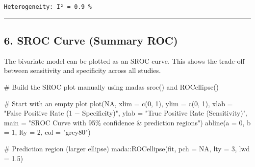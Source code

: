 \documentclass[
  letterpaper,
  DIV=11,
  numbers=noendperiod]{scrartcl}
\newenvironment{Shaded}{\begin{snugshade}}{\end{snugshade}}
\newcommand{\AttributeTok}[1]{\textcolor[rgb]{0.40,0.45,0.13}{#1}}
\newcommand{\CommentTok}[1]{\textcolor[rgb]{0.37,0.37,0.37}{#1}}
\newcommand{\ConstantTok}[1]{\textcolor[rgb]{0.56,0.35,0.01}{#1}}
\newcommand{\DecValTok}[1]{\textcolor[rgb]{0.68,0.00,0.00}{#1}}
\newcommand{\FloatTok}[1]{\textcolor[rgb]{0.68,0.00,0.00}{#1}}
\newcommand{\FunctionTok}[1]{\textcolor[rgb]{0.28,0.35,0.67}{#1}}
\newcommand{\NormalTok}[1]{\textcolor[rgb]{0.00,0.23,0.31}{#1}}
\newcommand{\SpecialCharTok}[1]{\textcolor[rgb]{0.37,0.37,0.37}{#1}}
\newcommand{\StringTok}[1]{\textcolor[rgb]{0.13,0.47,0.30}{#1}}
\begin{document}
\begin{verbatim}
Heterogeneity: I² = 0.9 %
\end{verbatim}

\begin{center}\rule{0.5\linewidth}{0.5pt}\end{center}

\subsection{6. SROC Curve (Summary ROC)}\label{sroc-curve-summary-roc}

The bivariate model can be plotted as an SROC curve. This shows the
trade-off between sensitivity and specificity across all studies.

\begin{Shaded}
\begin{Highlighting}[]
\CommentTok{\# Build the SROC plot manually using mada\textquotesingle{}s sroc() and ROCellipse()}

\CommentTok{\# Start with an empty plot}
\FunctionTok{plot}\NormalTok{(}\ConstantTok{NA}\NormalTok{, }\AttributeTok{xlim =} \FunctionTok{c}\NormalTok{(}\DecValTok{0}\NormalTok{, }\DecValTok{1}\NormalTok{), }\AttributeTok{ylim =} \FunctionTok{c}\NormalTok{(}\DecValTok{0}\NormalTok{, }\DecValTok{1}\NormalTok{),}
     \AttributeTok{xlab =} \StringTok{"False Positive Rate (1 − Specificity)"}\NormalTok{,}
     \AttributeTok{ylab =} \StringTok{"True Positive Rate (Sensitivity)"}\NormalTok{,}
     \AttributeTok{main =} \StringTok{"SROC Curve with 95\% confidence \& prediction regions"}\NormalTok{)}
\FunctionTok{abline}\NormalTok{(}\AttributeTok{a =} \DecValTok{0}\NormalTok{, }\AttributeTok{b =} \DecValTok{1}\NormalTok{, }\AttributeTok{lty =} \DecValTok{2}\NormalTok{, }\AttributeTok{col =} \StringTok{"grey80"}\NormalTok{)}

\CommentTok{\# Prediction region (larger ellipse)}
\NormalTok{mada}\SpecialCharTok{::}\FunctionTok{ROCellipse}\NormalTok{(fit, }\AttributeTok{pch =} \ConstantTok{NA}\NormalTok{, }\AttributeTok{lty =} \DecValTok{3}\NormalTok{, }\AttributeTok{lwd =} \FloatTok{1.5}\NormalTok{)}
\end{Highlighting}
\end{Shaded}
\end{document}
